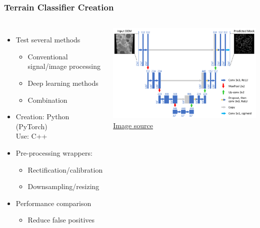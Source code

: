 \documentclass[aspectratio=169]{rubeamer}
\newif\ifpause
\newcommand{\mypause}{\ifpause \pause \fi}
\begin{document}
\begin{frame}
  \frametitle{Terrain Classifier Creation}
  \begin{columns}
      \begin{itemize}
        \item Test several methods
        \mypause
        \begin{itemize}
          \item Conventional signal/image processing%
          \mypause
          \item Deep learning methods%
          \mypause
          \item Combination
          \mypause
        \end{itemize}
        \item Creation: Python (PyTorch)\\Use: C++
        \mypause
        \item Pre-processing wrappers:
        \begin{itemize}
          \item Rectification/calibration
          \mypause
          \item Downsampling/resizing
        \end{itemize}
        \mypause
        \item Performance comparison
        \begin{itemize}
          \item Reduce false positives
          \mypause
        \end{itemize}
      \end{itemize}
    \centering
    \includegraphics[width=\textwidth]{Convolutional-neural-network-CNN-architecture-based-on-UNET-Ronneberger-et-al}\\
    \href{https://www.researchgate.net/figure/Convolutional-neural-network-CNN-architecture-based-on-UNET-Ronneberger-et-al_fig2_323597886}{\color{blue} Image source}
  \end{columns}
\end{frame}
\end{document}
